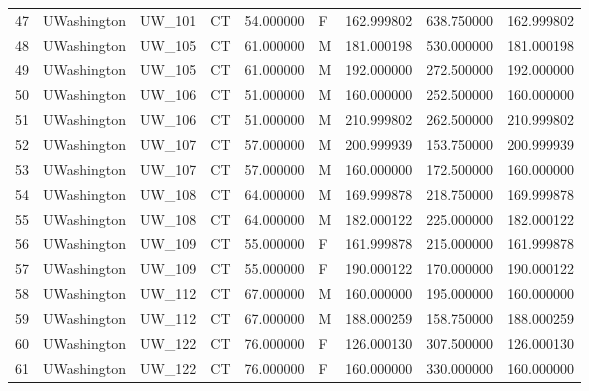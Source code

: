 \begin{tabular}{llllrlrrr}
47     &     UWashington &       UW\_101 &                 CT &  54.000000 &        F &       162.999802 &    638.750000 &  162.999802 \\
48     &     UWashington &       UW\_105 &                 CT &  61.000000 &        M &       181.000198 &    530.000000 &  181.000198 \\
49     &     UWashington &       UW\_105 &                 CT &  61.000000 &        M &       192.000000 &    272.500000 &  192.000000 \\
50     &     UWashington &       UW\_106 &                 CT &  51.000000 &        M &       160.000000 &    252.500000 &  160.000000 \\
51     &     UWashington &       UW\_106 &                 CT &  51.000000 &        M &       210.999802 &    262.500000 &  210.999802 \\
52     &     UWashington &       UW\_107 &                 CT &  57.000000 &        M &       200.999939 &    153.750000 &  200.999939 \\
53     &     UWashington &       UW\_107 &                 CT &  57.000000 &        M &       160.000000 &    172.500000 &  160.000000 \\
54     &     UWashington &       UW\_108 &                 CT &  64.000000 &        M &       169.999878 &    218.750000 &  169.999878 \\
55     &     UWashington &       UW\_108 &                 CT &  64.000000 &        M &       182.000122 &    225.000000 &  182.000122 \\
56     &     UWashington &       UW\_109 &                 CT &  55.000000 &        F &       161.999878 &    215.000000 &  161.999878 \\
57     &     UWashington &       UW\_109 &                 CT &  55.000000 &        F &       190.000122 &    170.000000 &  190.000122 \\
58     &     UWashington &       UW\_112 &                 CT &  67.000000 &        M &       160.000000 &    195.000000 &  160.000000 \\
59     &     UWashington &       UW\_112 &                 CT &  67.000000 &        M &       188.000259 &    158.750000 &  188.000259 \\
60     &     UWashington &       UW\_122 &                 CT &  76.000000 &        F &       126.000130 &    307.500000 &  126.000130 \\
61     &     UWashington &       UW\_122 &                 CT &  76.000000 &        F &       160.000000 &    330.000000 &  160.000000 \\

\end{tabular}

